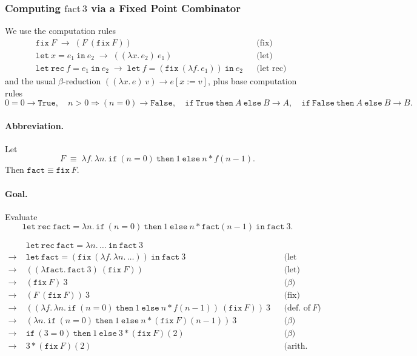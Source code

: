 \documentclass{article}
\theoremstyle{theorem}
\theoremstyle{definition}
\theoremstyle{remark}
\begin{document}
\subsubsection{Computing \texorpdfstring{$\mathrm{fact}\,3$}{fact 3} via a Fixed Point Combinator}

We use the computation rules
\[
\begin{aligned}
&\mathtt{fix}\ F \;\to\; (F\ (\mathtt{fix}\ F)) && \text{(fix)}\\
&\mathtt{let}\ x = e_1\ \mathtt{in}\ e_2 \;\to\; ((\lambda x.\, e_2)\ e_1) && \text{(let)}\\
&\mathtt{let\ rec}\ f = e_1\ \mathtt{in}\ e_2 \;\to\; \mathtt{let}\ f = (\mathtt{fix}\ (\lambda f.\, e_1))\ \mathtt{in}\ e_2 && \text{(let rec)}
\end{aligned}
\]
and the usual \(\beta\)-reduction \(((\lambda x.\,e)\ v) \to e[x:=v]\), plus base computation rules
\[
0=0\to \mathtt{True},\quad n{>}0 \Rightarrow (n=0)\to \mathtt{False},\quad
\mathtt{if}\ \mathtt{True}\ \mathtt{then}\ A\ \mathtt{else}\ B \to A,\quad
\mathtt{if}\ \mathtt{False}\ \mathtt{then}\ A\ \mathtt{else}\ B \to B.
\]

\paragraph{Abbreviation.}
Let
\[
F \;\equiv\; \lambda f.\,\lambda n.\,
\mathtt{if}\ (n=0)\ \mathtt{then}\ 1\ \mathtt{else}\ n * f(n-1).
\]
Then \(\mathtt{fact} \equiv \mathtt{fix}\ F\).

\paragraph{Goal.}
Evaluate
\[
\mathtt{let\ rec}\ \mathtt{fact} = \lambda n.\,\mathtt{if}\ (n=0)\ \mathtt{then}\ 1\ \mathtt{else}\ n * \mathtt{fact}(n-1)\ \mathtt{in}\ \mathtt{fact}\ 3.
\]

\begin{align*}
&\mathtt{let\ rec}\ \mathtt{fact}=\lambda n.\,\dots\ \mathtt{in}\ \mathtt{fact}\ 3\\
{}\to\;& \mathtt{let}\ \mathtt{fact}=(\mathtt{fix}\ (\lambda f.\,\lambda n.\,\dots))\ \mathtt{in}\ \mathtt{fact}\ 3
&&\text{(let rec)}\\
{}\to\;& ((\lambda \mathtt{fact}.\, \mathtt{fact}\ 3)\ (\mathtt{fix}\ F))
&&\text{(let)}\\
{}\to\;& (\mathtt{fix}\ F)\ 3
&&\text{(\(\beta\))}\\[4pt]
{}\to\;& (F\ (\mathtt{fix}\ F))\ 3
&&\text{(fix)}\\
{}\to\;& ((\lambda f.\,\lambda n.\,\mathtt{if}\ (n=0)\ \mathtt{then}\ 1\ \mathtt{else}\ n * f(n-1))\ (\mathtt{fix}\ F))\ 3
&&\text{(def.\ of \(F\))}\\
{}\to\;& (\lambda n.\,\mathtt{if}\ (n=0)\ \mathtt{then}\ 1\ \mathtt{else}\ n * (\mathtt{fix}\ F)(n-1))\ 3
&&\text{(\(\beta\))}\\
{}\to\;& \mathtt{if}\ (3=0)\ \mathtt{then}\ 1\ \mathtt{else}\ 3 * (\mathtt{fix}\ F)(2)
&&\text{(\(\beta\))}\\
{}\to\;& 3 * (\mathtt{fix}\ F)(2)
&&\text{(arith.\ and if-False)}
\end{align*}
\end{document}
